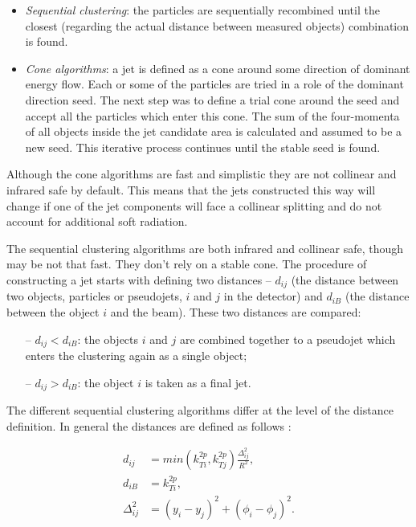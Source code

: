 \begin{itemize}
 \item \textit{Sequential clustering}: the particles are sequentially recombined until the closest (regarding the actual distance between measured
 objects) combination is found.
 \item \textit{Cone algorithms}: a jet is defined as a cone around some direction of dominant energy flow. Each or some of the particles are tried 
 in a role of the dominant direction seed. The next step was to define a trial cone around the seed and accept all the particles which enter this cone.
 The sum of the four-momenta of all objects inside the jet candidate area is calculated and assumed to be a new seed. This iterative process continues
 until the stable seed is found.
\end{itemize}

Although the cone algorithms are fast and simplistic they are not collinear and infrared safe by default. This means that the jets constructed this way will
change if one of the jet components will face a collinear splitting and do not account for additional soft radiation.

The sequential clustering algorithms are both infrared and collinear safe, though may be not that fast. They don't rely on a stable cone. The procedure of constructing
a jet starts with defining two distances -- $d_{ij}$ (the distance between two objects, particles or pseudojets, $i$ and $j$ in the detector) and $d_{iB}$ (the distance between the object $i$
and the beam). These two distances are compared:

\begin{itemize}
 \item [--] $d_{ij} < d_{iB}$: the objects $i$ and $j$ are combined together to a pseudojet which enters the clustering again as a single object;
 \item [--] $d_{ij} > d_{iB}$: the object $i$ is taken as a final jet.
\end{itemize}

The different sequential clustering algorithms differ at the level of the distance definition. In general the distances are defined as follows \cite{Cacciari:2008gp}:

\begin{align}
 d_{ij} & = min(k_{Ti}^{2p}, k_{Tj}^{2p}) \frac{\Delta_{ij}^{2}}{R^{2}},\label{eq:ktDist} \\
 d_{iB} & = k_{Ti}^{2p}, \\
 \Delta_{ij}^{2} & = (y_{i} - y_{j})^{2} + (\phi_{i} - \phi_{j})^{2}.
\end{align}

